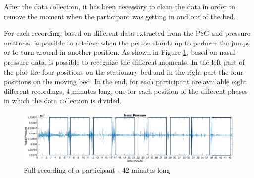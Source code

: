After the data collection, it has been necessary to clean the data in order to remove the moment when the participant was getting in and out of the bed.\newline

 For each recording, based on different data extracted from the PSG and pressure mattress, is possible to retrieve when the person stands up to perform the jumps or to turn around in another position. As shown in Figure \ref{fig:recordingCutfull}, based on nasal pressure data, is possible to recognize the different moments. In the left part of the plot the four positions on the stationary bed and in the right part the four positions on the moving bed.
 In the end, for each participant are available eight different recordings, 4 minutes long, one for each position of the different phases in which the data collection is divided.


\begin{figure}[H]
    \centering
    \includegraphics[width=\textwidth]{img/full_new.pdf}
    \caption{Full recording of a participant - 42 minutes long}
    \label{fig:recordingCutfull}
\end{figure}